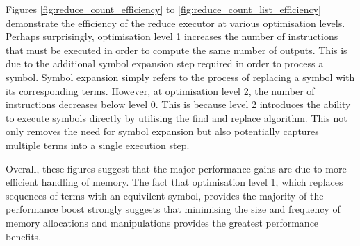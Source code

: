 Figures \ref{fig:reduce_count_efficiency} to \ref{fig:reduce_count_list_efficiency} demonstrate the efficiency of the reduce executor at various optimisation levels. Perhaps surprisingly, optimisation level 1 increases the number of instructions that must be executed in order to compute the same number of outputs. This is due to the additional symbol expansion step required in order to process a symbol. Symbol expansion simply refers to the process of replacing a symbol with its corresponding terms. However, at optimisation level 2, the number of instructions decreases below level 0. This is because level 2 introduces the ability to execute symbols directly by utilising the find and replace algorithm. This not only removes the need for symbol expansion but also potentially captures multiple terms into a single execution step.

Overall, these figures suggest that the major performance gains are due to more efficient handling of memory. The fact that optimisation level 1, which replaces sequences of terms with an equivilent symbol, provides the majority of the performance boost strongly suggests that minimising the size and frequency of memory allocations and manipulations provides the greatest performance benefits. 




